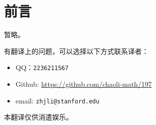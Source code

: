 \chapter*{前言}
暂略。

\vspace{2ex}

有翻译上的问题，可以选择以下方式联系译者：

\begin{itemize}
    \item QQ：{\tt 2236211567}
    \item Github: \url{https://github.com/chaoli-math/197}
    \item email: {\tt zhjli@stanford.edu}
\end{itemize}

本翻译仅供消遣娱乐。